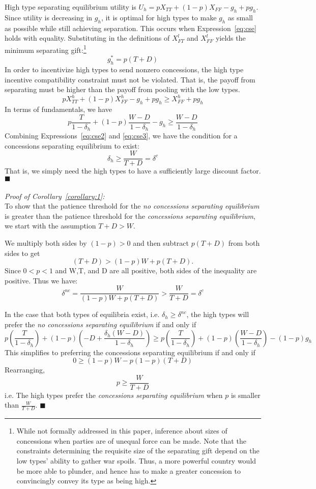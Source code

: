 \documentclass[12pt, letterpaper]{article}
\newcommand{\be}{\begin{equation}}
\newcommand{\ee}{\end{equation}}
\newcommand{\de}{\delta}
\begin{document}
{High type separating equilibrium utility is $U_h= pX_{TT}+(1-p)X_{FF} - g_h+pg_h$. Since utility is decreasing in $g_h$, it is optimal for high types to make $g_h$ as small as possible while still achieving separation. This occurs when Expression~\ref{eq:cse} holds with equality. Substituting in the definitions of $X_{FT}^l$ and $X_{FF}^l$ yields the minimum separating gift:\footnote {While not formally addressed in this paper, inference about sizes of concessions when parties are of unequal force can be made. Note that the constraints determining the requisite size of the separating gift depend on the low types' ability to gather war spoils. Thus, a more powerful country would be more able to plunder, and hence has to make a greater concession to convincingly convey its type as being high. }
\be
	g_h^*=p(T+D) 
	\label{eq:cse2}
\ee 
 In order to incentivize high types to send nonzero concessions, the high type incentive compatibility constraint must not be violated. That is, the payoff from separating must be higher than the payoff from pooling with the low types. 
$$pX_{TT}^h+(1-p)X_{FF}^h - g_h +pg_h \geq X_{FF}^h +pg_h$$
In terms of fundamentals, we have
\be
	p\frac{T}{1-\de_h}+(1-p)\frac{W-D}{1-\de_h} - g_h \geq \frac{W-D}{1-\de_h}
	\label{eq:cse3}
\ee
Combining Expressions~\ref{eq:cse2} and \ref{eq:cse3}, we have the condition for a concessions separating equilibrium to exist:
\be
\delta_h \geq \frac{W}{T+D} = \de^c
\ee
That is, we simply need the high types to have a sufficiently large discount factor. \hfill $\blacksquare$\\
\\
\emph{Proof of Corollary~\ref{corollary:1}:}\\
To show that the patience threshold for the \emph{no concessions separating equilibrium} is greater than the patience threshold for the \emph{concessions separating equilibrium}, we start with the assumption $T+D>W.$

We multiply both sides by $(1-p)>0$ and then subtract $p(T+D)$ from both sides to get
$$(T+D) > (1-p)W +p(T+D).$$
Since $0<p<1$ and W,T, and D are all positive, both sides of the inequality are positive. Thus we have:
$$\de^{nc} = \frac{W}{(1-p)W +p(T+D)} > \frac{W}{T+D} = \de^{c} $$

In the case that both types of equilibria exist, i.e. $\de_h \geq \de^{nc}$, the high types will prefer the \emph{no concessions separating equilibrium} if and only if
\begin{equation*}
p\left(\frac{T}{1- \delta_h}\right) +(1-p)\left({-D}+\frac{\delta_h(W-D)}{1- \delta_h} \right) \geq p\left(\frac{T}{1- \delta_h}\right)+(1-p)\left(\frac{W-D}{1- \delta_h}\right) - (1-p)g_h 
\end{equation*}
This simplifies to preferring the concessions separating equilibrium if and only if
$$0 \geq (1-p)W-p(1-p)(T+D)$$
Rearranging,
\be
 p \geq \frac{W}{T+D}
\ee
i.e. The high types prefer the \emph{concessions separating equilibrium} when $p$ is smaller than $\frac{W}{T+D}$. \hfill $\blacksquare$

}
\end{document}

